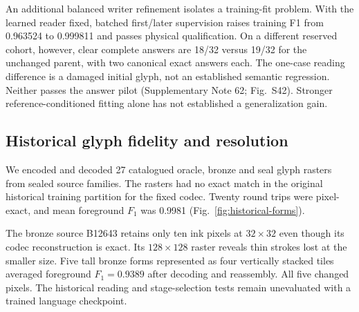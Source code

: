 \documentclass[12pt,a4paper]{article}
\begin{document}
An additional balanced writer refinement isolates a training-fit problem.
With the learned reader fixed, batched first/later supervision raises training
F1 from 0.963524 to 0.999811 and passes physical qualification. On a different
reserved cohort, however, clear complete answers are 18/32 versus 19/32 for the
unchanged parent, with two canonical exact answers each. The one-case reading
difference is a damaged initial glyph, not an established semantic regression.
Neither passes the answer pilot (Supplementary Note 62; Fig.~S42). Stronger
reference-conditioned fitting alone has not established a generalization gain.



\subsection*{Historical glyph fidelity and resolution}
We encoded and decoded 27 catalogued oracle, bronze and seal glyph rasters
from sealed source families. The rasters had no exact match in the original
historical training partition for the fixed codec. Twenty round trips were
pixel-exact, and mean foreground $F_1$ was 0.9981 (Fig.~\ref{fig:historical-forms}).

The bronze source B12643 retains only ten ink pixels at $32\times32$ even
though its codec reconstruction is exact. Its $128\times128$ raster reveals
thin strokes lost at the smaller size. Five tall bronze forms represented as
four vertically stacked tiles averaged foreground $F_1=0.9389$ after decoding
and reassembly. All five changed pixels. The historical reading and
stage-selection tests remain unevaluated with a trained language checkpoint.

\end{document}
